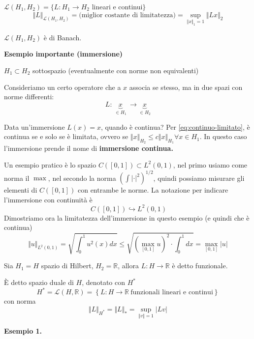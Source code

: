 \documentclass[10pt,a4paper,twoside,openright]{book}
\begin{document}
\begin{definition}
	$\mathcal{L}(H_{1},H_{2}) =\{L:H_{1}\rightarrow H_{2}$ lineari e continui$\}$
	\begin{equation*}
		\Vert L\Vert _{\mathcal{L}(H_{1},H_{2})} =\text{(miglior costante di limitatezza)} =\sup _{\Vert x\Vert _{1} =1}\Vert Lx\Vert _{2}
	\end{equation*}
\end{definition}
\begin{theorem}
	$\displaystyle \mathcal{L}(H_{1},H_{2})$ è di Banach.
\end{theorem}
\textbf{Esempio importante (immersione)}

$\displaystyle H_{1} \subset H_{2}$ sottospazio (eventualmente con norme non equivalenti)

Consideriamo un certo operatore che a $x$ associa se stesso, ma in due spazi con norme differenti:
\begin{equation*}
	L:\ \underbrace{x}_{\in H_{1}} \ \rightarrow \underbrace{x}_{\in H_{2}}
\end{equation*}

Data un'immersione $\displaystyle L(x) =x$, quando è continua? Per \eqref{eq:continuo-limitato}, è continua se e solo se è limitata, ovvero se $\displaystyle \Vert x\Vert _{H_{2}} \leqslant c\Vert x\Vert _{H_{1}} \forall x\in H_{1}$. In questo caso l'immersione prende il nome di \textbf{immersione continua.}

Un esempio pratico è lo spazio $\displaystyle C([ 0,1]) \subset L^{2}(0,1)$, nel primo usiamo come norma il $\max$, nel secondo la norma $\left(\int | \cdot | ^{2}\right)^{1/2}$, quindi possiamo misurare gli elementi di $\displaystyle C([ 0,1])$ con entrambe le norme. La notazione per indicare l'immersione con continuità è
\begin{equation*}
	\ C([ 0,1]) \hookrightarrow L^{2}(0,1)
\end{equation*}
Dimostriamo ora la limitatezza dell'immersione in questo esempio (e quindi che è continua)
\begin{equation*}
	\Vert u\Vert _{L^{2}(0,1)} =\sqrt{\int ^{1}_{0} u^{2}(x) dx} \leqslant \sqrt{\left(\max_{[ 0,1]} u\right)^{2} \cdot \int ^{1}_{0} dx} =\max_{[ 0,1]}| u| 
\end{equation*}
\begin{definition}
	[Funzionale] Sia $\displaystyle H_{1} =H$ spazio di Hilbert, $\displaystyle H_{2} =\mathbb{R}$, allora $\displaystyle L:H\rightarrow \mathbb{R}$ è detto funzionale.
\end{definition}
\begin{definition}
	 È detto spazio duale di $\displaystyle H$, denotato con $\displaystyle H^{*}$
	\begin{equation*}
		H^{*} =\mathcal{L}(H,\mathbb{R}) =\left\{L:H\rightarrow \mathbb{R} \ \text{funzionali lineari e continui}\right\}
	\end{equation*}
	con norma
	\begin{equation*}
		\Vert L\Vert _{H^{*}} =\Vert L\Vert _{*} =\sup _{\Vert v\Vert =1}| Lv| 
	\end{equation*}
\end{definition}
\textbf{Esempio 1.}
\end{document}
